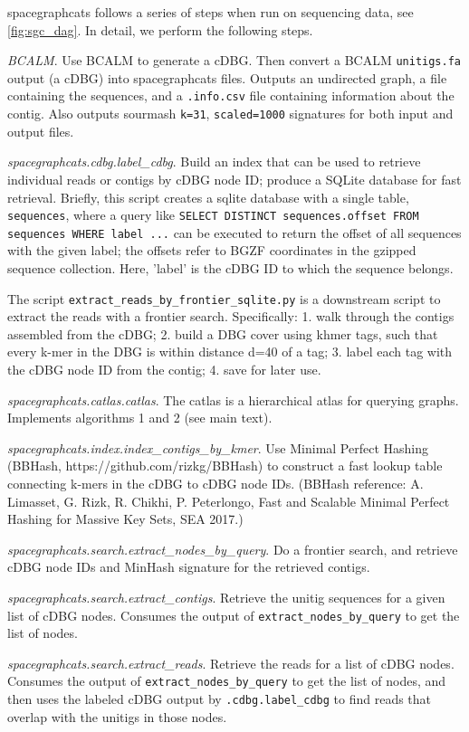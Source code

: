 \textsf{spacegraphcats} follows a series of steps when run on sequencing
data, see \autoref{fig:sgc_dag}. In detail, we perform the following
steps.

\emph{BCALM}. Use BCALM to generate a cDBG. Then convert a BCALM {\tt unitigs.fa}
output (a cDBG) into spacegraphcats files.
Outputs an undirected graph, a file containing the sequences, and a
{\tt .info.csv} file containing information about the contig. Also outputs
sourmash {\tt k=31}, {\tt scaled=1000} signatures for both input and
output files.

\emph{spacegraphcats.cdbg.label\_cdbg}. Build an index that can be
used to retrieve individual reads or contigs by cDBG node ID; produce
a SQLite database for fast retrieval. Briefly, this script creates a
sqlite database with a single table, {\tt sequences}, where a query like
{\tt SELECT DISTINCT sequences.offset FROM sequences WHERE label ...}
can be executed to return the offset of all sequences with the given
label; the offsets refer to BGZF coordinates in the gzipped sequence collection. Here, 'label' is the cDBG ID to which the sequence belongs.

The script {\tt extract\_reads\_by\_frontier\_sqlite.py} is a downstream script to
extract the reads with a frontier search.
Specifically: 1. walk through the contigs assembled from the cDBG;
2. build a DBG cover using khmer tags, such that every k-mer in the DBG is
within distance d=40 of a tag;  3. label each tag with the cDBG node ID
from the contig; 4. save for later use.

\emph{spacegraphcats.catlas.catlas}. The catlas is a hierarchical
atlas for querying graphs. Implements algorithms 1 and 2 (see main text).

\emph{spacegraphcats.index.index\_contigs\_by\_kmer}. Use Minimal Perfect
Hashing (BBHash, https://github.com/rizkg/BBHash) to construct a fast
lookup table connecting k-mers in the cDBG to cDBG node IDs. (BBHash
reference: A. Limasset, G. Rizk, R. Chikhi, P. Peterlongo, Fast and
Scalable Minimal Perfect Hashing for Massive Key Sets, SEA 2017.)

\emph{spacegraphcats.search.extract\_nodes\_by\_query}. Do a frontier
search, and retrieve cDBG node IDs and MinHash signature for the retrieved
contigs.

\emph{spacegraphcats.search.extract\_contigs}. Retrieve the unitig sequences
for a given list of cDBG nodes.  Consumes the output of {\tt extract\_nodes\_by\_query}
to get the list of nodes.

\emph{spacegraphcats.search.extract\_reads}. Retrieve the reads for a list of cDBG
nodes.  Consumes the output of {\tt extract\_nodes\_by\_query} to get the list of
nodes, and then uses the labeled cDBG output by {\tt .cdbg.label\_cdbg} to
find reads that overlap with the unitigs in those nodes.


